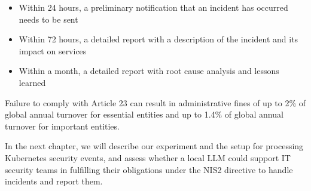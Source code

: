 \begin{itemize}
    \item Within 24 hours, a preliminary notification that an incident has occurred needs to be sent
    \item Within 72 hours, a detailed report with a description of the incident and its impact on services
    \item Within a month, a detailed report with root cause analysis and lessons learned
\end{itemize}

Failure to comply with Article 23 can result in administrative fines of up to 2\% of global annual turnover for essential entities and up to 1.4\% of global annual turnover for important entities.

In the next chapter, we will describe our experiment and the setup for processing Kubernetes security events, and assess whether a local LLM could support IT security teams in fulfilling their obligations under the NIS2 directive to handle incidents and report them.
